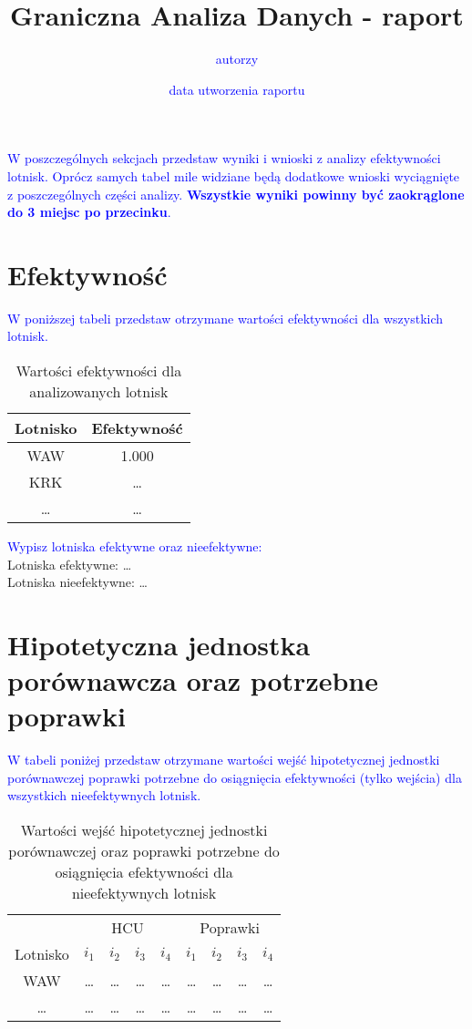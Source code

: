 \documentclass[a4paper,12pt]{article}
\author{\textcolor{blue}{autorzy}}
\date{\textcolor{blue}{data utworzenia raportu}}
\title{Graniczna Analiza Danych - raport}
\begin{document}
\maketitle

\textcolor{blue}{W poszczególnych sekcjach przedstaw wyniki i wnioski z analizy efektywności lotnisk. Oprócz samych tabel mile widziane będą dodatkowe wnioski wyciągnięte z poszczególnych części analizy. \textbf{Wszystkie wyniki powinny być zaokrąglone do 3 miejsc po przecinku}.}

\section{Efektywność}
\textcolor{blue}{W poniższej tabeli przedstaw otrzymane wartości efektywności dla wszystkich lotnisk.}
\begin{table}[H]
    \centering
    \begin{tabular}{c|c}
    \hline
         Lotnisko & Efektywność  \\ \hline
         WAW & 1.000 \\
         KRK & \ldots \\
         \ldots & \ldots \\
         \hline
    \end{tabular}
    \caption{Wartości efektywności dla analizowanych lotnisk}
    \label{tab:airports-efficiency}
\end{table}

\noindent \textcolor{blue}{Wypisz lotniska efektywne oraz nieefektywne:} \\
Lotniska efektywne: \ldots \\
Lotniska nieefektywne: \ldots

\section{Hipotetyczna jednostka porównawcza oraz potrzebne poprawki}

\textcolor{blue}{W tabeli poniżej przedstaw otrzymane wartości wejść hipotetycznej jednostki porównawczej poprawki potrzebne do osiągnięcia efektywności (tylko wejścia) dla wszystkich nieefektywnych lotnisk.}

\begin{table}[H]
    \centering
    \begin{tabular}{c|cccc|cccc}
    \hline
        & \multicolumn{4}{c|}{HCU} & \multicolumn{4}{c}{Poprawki}  \\
         Lotnisko & $i_1$ & $i_2$ & $i_3$ & $i_4$ & $i_1$ & $i_2$ & $i_3$ & $i_4$ \\ \hline
         WAW & \ldots & \ldots & \ldots & \ldots & \ldots & \ldots & \ldots & \ldots \\
         \ldots & \ldots & \ldots & \ldots & \ldots & \ldots & \ldots & \ldots & \ldots \\
    \end{tabular}
    \caption{Wartości wejść hipotetycznej jednostki porównawczej oraz poprawki potrzebne do osiągnięcia efektywności dla nieefektywnych lotnisk }
    \label{tab:airports-hcu-and-improvements}
\end{table}
\end{document}
